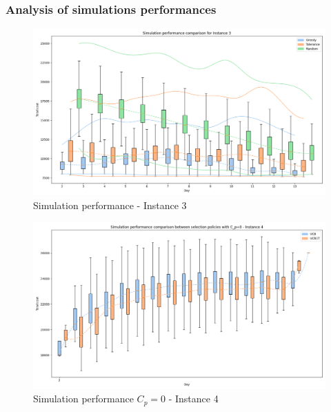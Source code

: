 \subsubsection*{Analysis of simulations performances}
\begin{figure}[!ht]
    \centering
    \includegraphics[width=\textwidth]{Figures/3 - Simulation performance.png}
    \caption{Simulation performance - Instance 3}
    \label{fig:sim_perf_3}
\end{figure}

\begin{figure}[!ht]
    \centering
    \includegraphics[width=\textwidth]{Figures/4 - Simulation performance - CP=0.png}
    \caption{Simulation performance $C_p=0$ - Instance 4}
    \label{fig:sim_perf_4_cp_zero}
\end{figure}

